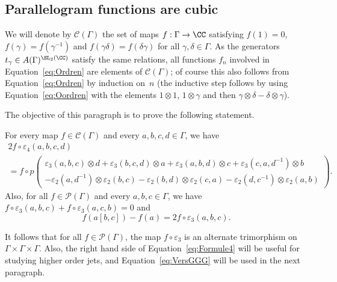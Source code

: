 \subsection{Parallelogram functions are cubic}\label{ssec:paralcubic}

We will denote by $\mathcal{C}(\Gamma)$ the set of maps $f:\Gamma\to \CC$
satisfying $f(1)=0$, $f(\gamma)=f(\gamma^{-1})$ and
$f(\gamma\delta)=f(\delta\gamma)$ for all $\gamma,\delta\in \Gamma$.
As the generators $t_{\gamma}\in A(\Gamma)^{\SL_2(\CC)}$ satisfy the same
relations, all functions $f_n$ involved in Equation~\eqref{eq:Ordren} are
elements of $\mathcal{C}(\Gamma)$; of course this also follows
from Equation~\eqref{eq:Ordren} by induction on~$n$
(the inductive step
follows by using Equation~\eqref{eq:Oordren} with the elements
$1\otimes 1$, $1\otimes\gamma$ and then
$\gamma\otimes\delta-\delta\otimes\gamma$).

The objective of this paragraph is to prove the following statement.
\begin{lemma}\label{lem:ParallCubiques}
For every map $f\in\mathcal{C}(\Gamma)$ and every $a,b,c,d\in\Gamma$,
we have
\begin{multline}\label{eq:Formule4}
2f\circ\varepsilon_4(a,b,c,d)\\
= f\circ p\left(\begin{array}{c}
\varepsilon_3(a,b,c)\otimes d+\varepsilon_3(b,c,d)\otimes a +
\varepsilon_3(a,b,d)\otimes c + \varepsilon_3(c,a,d^{-1})\otimes b \\
- \varepsilon_2(a,d^{-1})\otimes\varepsilon_2(b,c)-\varepsilon_2(b,d)
\otimes\varepsilon_2(c,a)-\varepsilon_2(d,c^{-1})\otimes\varepsilon_2(a,b)
\end{array}\right).
\end{multline}
Also, for all $f\in\mathcal{P}(\Gamma)$ and every $a,b,c\in\Gamma$, we
have $f\circ\varepsilon_3(a,b,c)+f\circ \varepsilon_3(a,c,b)=0$ and
\begin{equation}\label{eq:VersGGG}
f(a[b,c])-f(a)= 2f\circ \varepsilon_3(a,b,c).
\end{equation}
\end{lemma}
It follows that for all $f\in\mathcal{P}(\Gamma)$, the map
$f\circ\varepsilon_3$ is an alternate trimorphism on
$\Gamma\times\Gamma\times\Gamma$. Also, the right hand side of
Equation~\eqref{eq:Formule4} will be useful for studying higher order jets,
and Equation~\eqref{eq:VersGGG} will be used in the next paragraph.


